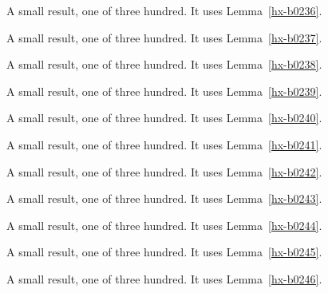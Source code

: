 \begin{lemma}[Bulk 237]\label{hx-b0237}
A small result, one of three hundred. It uses Lemma~\ref{hx-b0236}.
\end{lemma}

\begin{lemma}[Bulk 238]\label{hx-b0238}
A small result, one of three hundred. It uses Lemma~\ref{hx-b0237}.
\end{lemma}

\begin{lemma}[Bulk 239]\label{hx-b0239}
A small result, one of three hundred. It uses Lemma~\ref{hx-b0238}.
\end{lemma}

\begin{lemma}[Bulk 240]\label{hx-b0240}
A small result, one of three hundred. It uses Lemma~\ref{hx-b0239}.
\end{lemma}

\begin{lemma}[Bulk 241]\label{hx-b0241}
A small result, one of three hundred. It uses Lemma~\ref{hx-b0240}.
\end{lemma}

\begin{lemma}[Bulk 242]\label{hx-b0242}
A small result, one of three hundred. It uses Lemma~\ref{hx-b0241}.
\end{lemma}

\begin{lemma}[Bulk 243]\label{hx-b0243}
A small result, one of three hundred. It uses Lemma~\ref{hx-b0242}.
\end{lemma}

\begin{lemma}[Bulk 244]\label{hx-b0244}
A small result, one of three hundred. It uses Lemma~\ref{hx-b0243}.
\end{lemma}

\begin{lemma}[Bulk 245]\label{hx-b0245}
A small result, one of three hundred. It uses Lemma~\ref{hx-b0244}.
\end{lemma}

\begin{lemma}[Bulk 246]\label{hx-b0246}
A small result, one of three hundred. It uses Lemma~\ref{hx-b0245}.
\end{lemma}

\begin{lemma}[Bulk 247]\label{hx-b0247}
A small result, one of three hundred. It uses Lemma~\ref{hx-b0246}.
\end{lemma}

